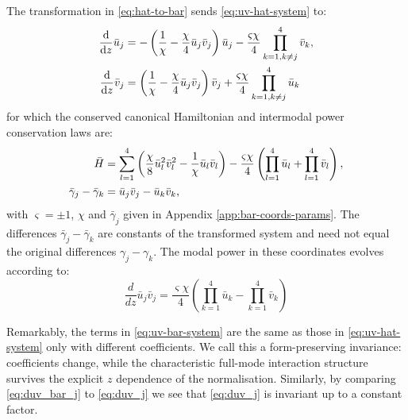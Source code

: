 \documentclass[11pt,a4paper]{article}
\numberwithin{equation}{section}
\begin{document}
The transformation in \eqref{eq:hat-to-bar} sends \eqref{eq:uv-hat-system} to:
\begin{align}
\frac{\mathrm{d}}{\mathrm{d}z} \bar{u}_j &= -\left(\frac{1}{\chi} - \frac{\chi}{4}\bar{u}_j \bar{v}_j \right) \bar{u}_j - \frac{\varsigma \chi}{4} \prod\limits_{k=1, k \ne j}^{4} \bar{v}_k, \notag \\
\frac{\mathrm{d}}{\mathrm{d}z} \bar{v}_j &= \left( \frac{1}{\chi} - \frac{\chi}{4}\bar{u}_j \bar{v}_j\right) \bar{v}_j + \frac{\varsigma \chi}{4} \prod\limits_{k=1, k \ne j}^{4} \bar{u}_k \label{eq:uv-bar-system}
\end{align}
for which the conserved canonical Hamiltonian and intermodal power conservation laws are:
\begin{align}
\bar{H} &= \sum_{l=1}^{4} \left(\frac{\chi}{8} \bar{u}^{2}_l \bar{v}^{2}_l  - \frac{1}{\chi}  \bar{u}_l \bar{v}_l \right) - \frac{\varsigma \chi}{4} \left(\prod_{l=1}^{4} \bar{u}_l + \prod_{l=1}^{4} \bar{v}_l\right), \notag \\
\bar{\gamma}_j - \bar{\gamma}_k &= \bar{u}_j \bar{v}_j - \bar{u}_k \bar{v}_k,
\end{align}
with $\varsigma =\pm 1$, $\chi$ and $\bar{\gamma}_j$ given in Appendix \ref{app:bar-coords-params}.
The differences $\bar{\gamma}_j-\bar{\gamma}_k$ are constants of the transformed system and need not equal the original differences $\gamma_j-\gamma_k$.
The modal power in these coordinates evolves according to:
\begin{equation}
\label{eq:duv_bar_j}
\frac{d}{d z} \bar{u}_j \bar{v}_j = \frac{\varsigma \chi}{4}\left(\prod\limits_{k=1}^{4} \bar{u}_k - \prod\limits_{k=1}^{4} \bar{v}_k\right)
\end{equation}

Remarkably, the terms in \eqref{eq:uv-bar-system} are the same as those in \eqref{eq:uv-hat-system} only with different coefficients.
We call this a form-preserving invariance: coefficients change, while the characteristic full-mode interaction structure survives the explicit $z$ dependence of the normalisation.
Similarly, by comparing \eqref{eq:duv_bar_j} to \eqref{eq:duv_j} we see that \eqref{eq:duv_j} is invariant up to a constant factor.
\end{document}
